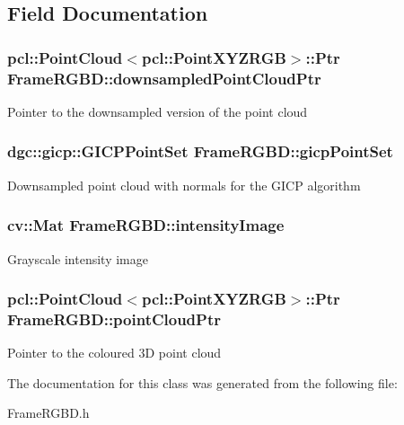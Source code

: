 \subsection{Field Documentation}
\hypertarget{class_frame_r_g_b_d_a7c5a9dcf60d9ee1ac6d4d707257e965f}{
\subsubsection[{downsampledPointCloudPtr}]{\setlength{\rightskip}{0pt plus 5cm}pcl::PointCloud$<$pcl::PointXYZRGB$>$::Ptr {\bf FrameRGBD::downsampledPointCloudPtr}}}
\label{class_frame_r_g_b_d_a7c5a9dcf60d9ee1ac6d4d707257e965f}
Pointer to the downsampled version of the point cloud \hypertarget{class_frame_r_g_b_d_aeadd4cb8c9658d6b995ce72d9bef200d}{
\subsubsection[{gicpPointSet}]{\setlength{\rightskip}{0pt plus 5cm}dgc::gicp::GICPPointSet {\bf FrameRGBD::gicpPointSet}}}
\label{class_frame_r_g_b_d_aeadd4cb8c9658d6b995ce72d9bef200d}
Downsampled point cloud with normals for the GICP algorithm \hypertarget{class_frame_r_g_b_d_a198aed26e98378616a1aee67f1e32182}{
\subsubsection[{intensityImage}]{\setlength{\rightskip}{0pt plus 5cm}cv::Mat {\bf FrameRGBD::intensityImage}}}
\label{class_frame_r_g_b_d_a198aed26e98378616a1aee67f1e32182}
Grayscale intensity image \hypertarget{class_frame_r_g_b_d_a03899f04e6597201e13fb2e046fd0983}{
\subsubsection[{pointCloudPtr}]{\setlength{\rightskip}{0pt plus 5cm}pcl::PointCloud$<$pcl::PointXYZRGB$>$::Ptr {\bf FrameRGBD::pointCloudPtr}}}
\label{class_frame_r_g_b_d_a03899f04e6597201e13fb2e046fd0983}
Pointer to the coloured 3D point cloud 

The documentation for this class was generated from the following file:\begin{DoxyCompactItemize}
\item 
FrameRGBD.h\end{DoxyCompactItemize}

